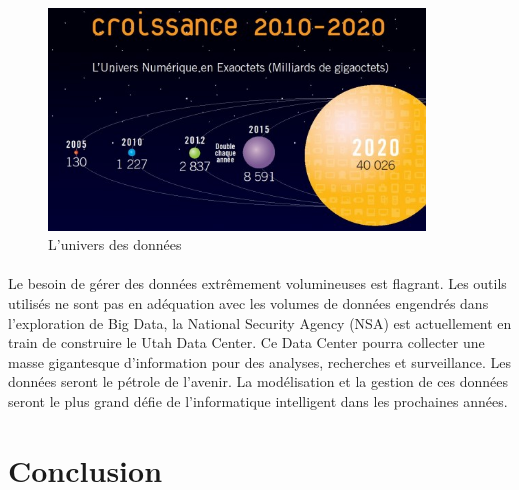 \documentclass[12pt,a4	]{report}
\begin{document}
\begin{figure}[H]
        \centering
                \centering
                \includegraphics[width=10cm]{datas.jpg}
               \caption{L'univers des données}

\end{figure}
\paragraph{}
Le besoin de gérer des données extrêmement volumineuses est flagrant. Les outils utilisés ne sont pas en adéquation avec les volumes de données engendrés dans l'exploration de Big Data, la National Security Agency (NSA) est actuellement en train de construire le Utah Data Center. Ce Data Center pourra collecter une masse gigantesque d'information pour des analyses, recherches et surveillance. Les données seront le pétrole de l'avenir. La modélisation et la gestion de ces données seront le plus grand défie de l'informatique intelligent dans les prochaines années. 
\newpage
\section*{Conclusion}
\end{document}
